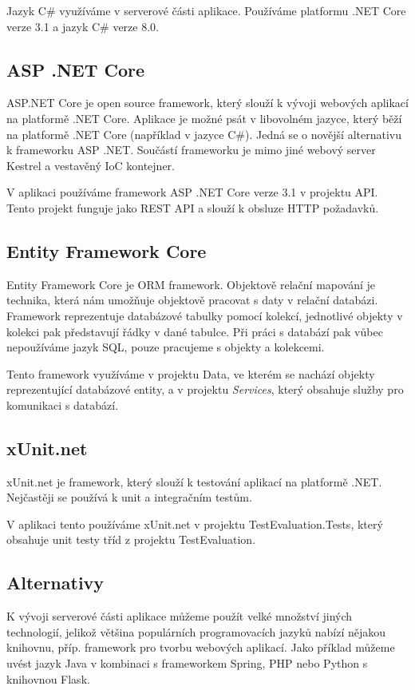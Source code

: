 Jazyk C\# využíváme v serverové části aplikace. Používáme platformu .NET Core verze 3.1 a jazyk C\# verze 8.0.

\subsection{ASP .NET Core}
ASP.NET Core je open source framework, který slouží k vývoji webových aplikací na platformě .NET Core. Aplikace je možné psát v libovolném jazyce, který běží na platformě .NET Core (například v jazyce C\#). Jedná se o novější alternativu k frameworku ASP .NET. Součástí frameworku je mimo jiné webový server Kestrel a vestavěný IoC kontejner.
\cite{AspNetCoreDocs}

V aplikaci používáme framework ASP .NET Core verze 3.1 v projektu API. Tento projekt funguje jako REST API a slouží k obsluze HTTP požadavků.

\subsection{Entity Framework Core}
Entity Framework Core je ORM framework. Objektově relační mapování je technika, která nám umožňuje objektově pracovat s daty v relační databázi. Framework reprezentuje databázové tabulky pomocí kolekcí, jednotlivé objekty v kolekci pak představují řádky v dané tabulce. Při práci s databází pak vůbec nepoužíváme jazyk SQL, pouze pracujeme s objekty a kolekcemi.
\cite{EfCoreDocs}

Tento framework využíváme v projektu Data, ve kterém se nachází objekty reprezentující databázové entity, a v projektu \textit{Services}, který obsahuje služby pro komunikaci s databází.

\subsection{xUnit.net}
xUnit.net je framework, který slouží k testování aplikací na platformě .NET. Nejčastěji se používá k unit a integračním testům. 
\cite{xUnitDocs}

V aplikaci tento používáme xUnit.net v projektu TestEvaluation.Tests, který obsahuje unit testy tříd z projektu TestEvaluation.

\subsection{Alternativy}

K vývoji serverové části aplikace můžeme použít velké množství jiných technologií, jelikož většina populárních programovacích jazyků nabízí nějakou knihovnu, příp. framework pro tvorbu webových aplikací.  Jako příklad můžeme uvést jazyk Java v kombinaci s frameworkem Spring, PHP nebo Python s knihovnou Flask. 

